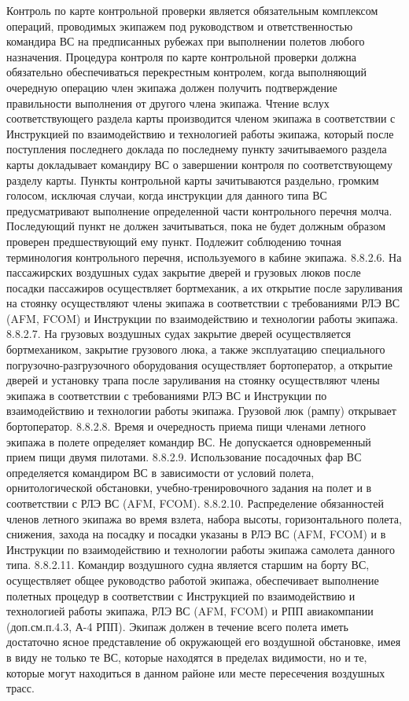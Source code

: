 Контроль по карте контрольной проверки является обязательным комплексом операций, проводимых экипажем под руководством и ответственностью командира ВС на предписанных рубежах при выполнении полетов любого назначения. Процедура контроля по карте контрольной проверки должна обязательно обеспечиваться перекрестным контролем, когда выполняющий очередную операцию член экипажа должен получить подтверждение правильности выполнения от другого члена экипажа.
Чтение вслух соответствующего раздела карты производится членом экипажа в соответствии с Инструкцией по взаимодействию и технологией работы экипажа, который после поступления последнего доклада по последнему пункту зачитываемого раздела карты докладывает командиру ВС о завершении контроля по соответствующему разделу карты.
Пункты контрольной карты зачитываются раздельно, громким голосом, исключая случаи, когда инструкции для данного типа ВС предусматривают выполнение определенной части контрольного перечня молча. 
Последующий пункт не должен зачитываться, пока не будет должным образом проверен предшествующий ему пункт. Подлежит соблюдению точная терминология контрольного перечня, используемого в кабине экипажа.
8.8.2.6. На пассажирских воздушных судах закрытие дверей и грузовых люков после посадки пассажиров осуществляет бортмеханик, а их открытие после заруливания на стоянку осуществляют члены экипажа в соответствии с требованиями РЛЭ ВС (AFM, FCOM) и Инструкции по взаимодействию и технологии работы экипажа.
8.8.2.7. На грузовых воздушных судах закрытие дверей осуществляется бортмехаником, закрытие грузового люка, а также эксплуатацию специального погрузочно-разгрузочного оборудования осуществляет бортоператор, а открытие дверей и установку трапа после заруливания на стоянку осуществляют члены экипажа в соответствии с требованиями РЛЭ ВС и Инструкции по взаимодействию и технологии работы экипажа. Грузовой люк (рампу) открывает бортоператор.
8.8.2.8. Время и очередность приема пищи членами летного экипажа в полете определяет командир ВС. Не допускается одновременный прием пищи двумя пилотами.
8.8.2.9. Использование посадочных фар ВС определяется командиром ВС в зависимости от условий полета, орнитологической обстановки, учебно-тренировочного задания на полет и в соответствии с РЛЭ ВС (AFM, FCOM).
8.8.2.10. Распределение обязанностей членов летного экипажа во время взлета, набора высоты, горизонтального полета, снижения, захода на посадку и посадки указаны в РЛЭ ВС (AFM, FCOM) и в Инструкции по взаимодействию и технологии работы экипажа самолета данного типа. 
8.8.2.11. Командир воздушного судна является старшим на борту ВС, осуществляет общее руководство работой экипажа, обеспечивает выполнение полетных процедур в соответствии с Инструкцией по взаимодействию и технологией работы экипажа, РЛЭ ВС (AFM, FCOM) и РПП авиакомпании (доп.см.п.4.3, А-4 РПП). Экипаж должен в течение всего полета иметь достаточно ясное представление об окружающей его воздушной обстановке, имея в виду не только те ВС, которые находятся в пределах видимости, но и те, которые могут находиться в данном районе или месте пересечения воздушных трасс.

